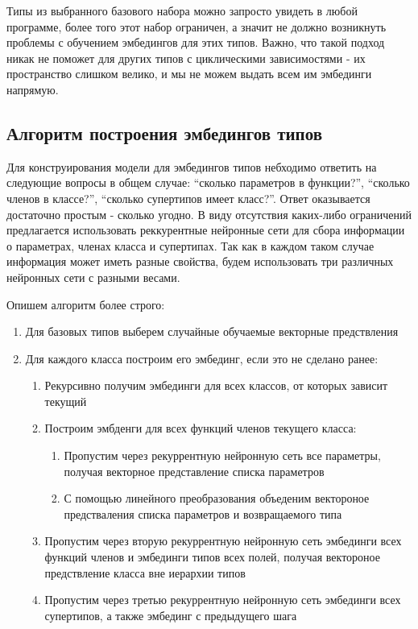\documentclass[times,specification,annotation]{itmo-student-thesis}
\begin{document}
Типы из выбранного базового набора можно запросто увидеть в любой программе, более того этот набор ограничен, а значит не должно возникнуть проблемы с обучением эмбедингов для этих типов. Важно, что такой подход никак не поможет для других типов с циклическими зависимостями - их пространство слишком велико, и мы не можем выдать всем им эмбединги напрямую.

\subsection{Алгоритм построения эмбедингов типов}\label{typeEmbAlgo}
Для конструирования модели для эмбедингов типов небходимо ответить на следующие вопросы в общем случае: ``сколько параметров в функции?'', ``сколько членов в классе?'', ``сколько супертипов имеет класс?''. Ответ оказывается достаточно простым - сколько угодно. В виду отсутствия каких-либо ограничений предлагается использовать реккурентные нейронные сети для сбора информации о параметрах, членах класса и супертипах. Так как в каждом таком случае информация может иметь разные свойства, будем использовать три различных нейронных сети с разными весами.

Опишем алгоритм более строго:
\begin{enumerate}
    \item Для базовых типов выберем случайные обучаемые векторные предствления
    \item Для каждого класса построим его эмбединг, если это не сделано ранее:
    \begin{enumerate}
        \item Рекурсивно получим эмбединги для всех классов, от которых зависит текущий
        \item Построим эмбденги для всех функций членов текущего класса:
        \begin{enumerate}
            \item Пропустим через рекуррентную нейронную сеть все параметры, получая векторное представление списка параметров
            \item С помощью линейного преобразования объеденим вектороное предстваления списка параметров и возвращаемого типа
        \end{enumerate}
        \item Пропустим через вторую рекуррентную нейронную сеть эмбединги всех функций членов и эмбединги типов всех полей, получая вектороное предствление класса вне иерархии типов
        \item Пропустим через третью рекуррентную нейронную сеть эмбединги всех супертипов, а также эмбединг с предыдущего шага
    \end{enumerate}
\end{enumerate}
\end{document}
